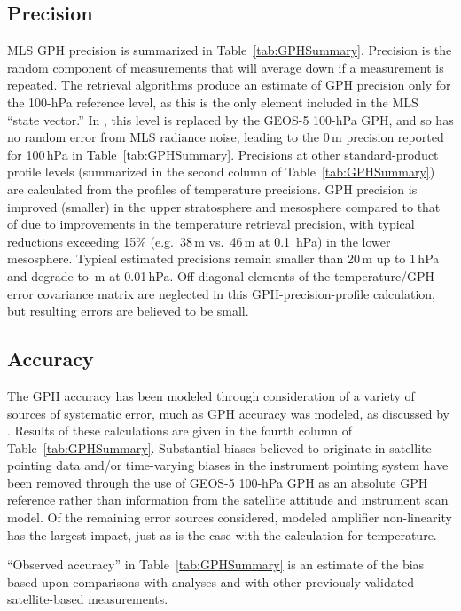 \subsection{Precision}

MLS \thisv GPH precision is summarized in Table~\ref{tab:GPHSummary}. Precision is the random component of measurements that will average down if a measurement is repeated. The retrieval algorithms produce an estimate of GPH precision only for the \mbox{100-hPa} reference level, as this is the only element included in the MLS ``state vector.'' In \thisv, this level is replaced by the \mbox{GEOS-5} \mbox{100-hPa} GPH, and so has no random error from MLS radiance noise, leading to the 0\,m precision reported for 100\,hPa in Table~\ref{tab:GPHSummary}. Precisions at other standard-product profile levels (summarized in the second column of Table~\ref{tab:GPHSummary}) are calculated from the profiles of temperature precisions.  \thisv GPH precision is improved (smaller) in the upper stratosphere and mesosphere compared to that of \prevv due to improvements in the temperature retrieval precision, with typical reductions exceeding 15\% (e.g.\ 38\,m vs.\ 46\,m at 0.1~hPa) in the lower mesosphere. Typical estimated precisions remain smaller than 20\,m up to 1\,hPa and degrade to \,m at 0.01\,hPa. Off-diagonal elements of the temperature/GPH error covariance matrix are neglected in this GPH-precision-profile calculation, but resulting errors are believed to be small.

\subsection{Accuracy}

The \thisv GPH accuracy has been modeled through consideration of a variety of sources of systematic error, much as \vii GPH accuracy was modeled, as discussed by \citet{SchwartzEtal:2008:Validation}. Results of these calculations are given in the fourth column of Table~\ref{tab:GPHSummary}. Substantial biases believed to originate in satellite pointing data and/or time-varying biases in the instrument pointing system have been removed through the use of \mbox{GEOS-5} \mbox{100-hPa} GPH as an absolute GPH reference rather than information from the satellite attitude and instrument scan model. Of the remaining error sources considered, modeled amplifier non-linearity has the largest impact, just as is the case with the calculation for temperature.

``Observed accuracy'' in Table~\ref{tab:GPHSummary} is an estimate of the bias based upon comparisons with analyses and with other previously validated satellite-based measurements.

